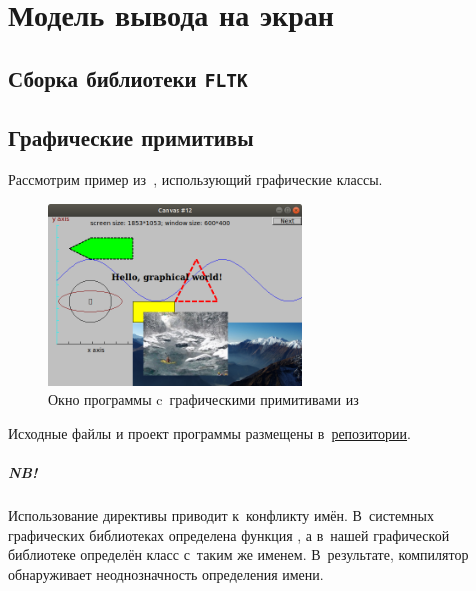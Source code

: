 
\chapter{Модель вывода на экран}

\section{Сборка библиотеки \texttt{FLTK}}



\section{Графические примитивы}
Рассмотрим пример из~, использующий графические классы.

\begin{figure}[ht]
    {\centering
        \includegraphics[width=0.6\textwidth]{images/shapes.png}

    }
    \caption{Окно программы c~графическими примитивами из~}
\end{figure}

\noindent Исходные файлы и проект программы размещены в~\href{\courserepourl}{репозитории}.

\begin{center}
\end{center}



\paragraph{NB!}
Использование директивы  приводит к~конфликту имён. В~системных графических библиотеках  определена функция , а в~нашей графической библиотеке определён класс с~таким же именем. В~результате, компилятор обнаруживает неоднозначность определения имени.

